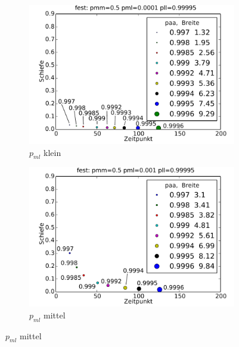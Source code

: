 \begin{figure}
\begin{subfigure}{0.6\textwidth}
\includegraphics[width=\textwidth]{bilder/paa/3fest_05_00001_p_099995}
\caption{$p_{ml}$ klein}
\end{subfigure}

\begin{subfigure}{0.6\textwidth}
\includegraphics[width=\textwidth]{bilder/paa/3fest_05_0001_p_099995}
\caption{$p_{ml}$ mittel}
\end{subfigure}


\end{figure}
